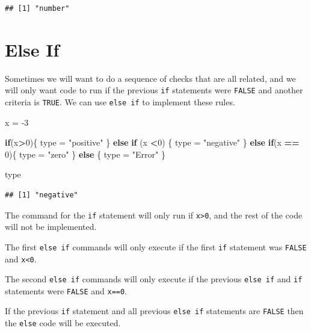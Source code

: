 \documentclass[
]{book}
\newenvironment{Shaded}{\begin{snugshade}}{\end{snugshade}}
\newcommand{\ControlFlowTok}[1]{\textcolor[rgb]{0.13,0.29,0.53}{\textbf{#1}}}
\newcommand{\DecValTok}[1]{\textcolor[rgb]{0.00,0.00,0.81}{#1}}
\newcommand{\NormalTok}[1]{#1}
\newcommand{\OperatorTok}[1]{\textcolor[rgb]{0.81,0.36,0.00}{\textbf{#1}}}
\newcommand{\StringTok}[1]{\textcolor[rgb]{0.31,0.60,0.02}{#1}}
\begin{document}
\begin{verbatim}
## [1] "number"
\end{verbatim}

\hypertarget{else-if}{%
\section{Else If}\label{else-if}}

Sometimes we will want to do a sequence of checks that are all related, and we will only want code to run if the previous \texttt{if} statements were \texttt{FALSE} and another criteria is \texttt{TRUE}. We can use \texttt{else\ if} to implement these rules.

\begin{Shaded}
\begin{Highlighting}[]
\NormalTok{x =}\StringTok{ }\DecValTok{-3}


\ControlFlowTok{if}\NormalTok{(x}\OperatorTok{>}\DecValTok{0}\NormalTok{)\{}
\NormalTok{    type =}\StringTok{ "positive"}
\NormalTok{\} }\ControlFlowTok{else} \ControlFlowTok{if}\NormalTok{ (x }\OperatorTok{<}\DecValTok{0}\NormalTok{) \{}
\NormalTok{    type =}\StringTok{ "negative"}
\NormalTok{\} }\ControlFlowTok{else} \ControlFlowTok{if}\NormalTok{(x }\OperatorTok{==}\StringTok{ }\DecValTok{0}\NormalTok{)\{}
\NormalTok{    type =}\StringTok{ "zero"}
\NormalTok{\} }\ControlFlowTok{else}\NormalTok{ \{}
\NormalTok{    type =}\StringTok{ "Error"}
\NormalTok{\}}

\NormalTok{type }
\end{Highlighting}
\end{Shaded}

\begin{verbatim}
## [1] "negative"
\end{verbatim}

The command for the \texttt{if} statement will only run if \texttt{x\textgreater{}0}, and the rest of the code will not be implemented.

The first \texttt{else\ if} commands will only execute if the first \texttt{if} statement was \texttt{FALSE} and \texttt{x\textless{}0}.

The second \texttt{else\ if} commands will only execute if the previous \texttt{else\ if} and \texttt{if} statements were \texttt{FALSE} and \texttt{x==0}.

If the previous \texttt{if} statement and all previous \texttt{else\ if} statements are \texttt{FALSE} then the \texttt{else} code will be executed.
\end{document}
